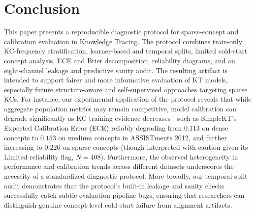 \section{Conclusion}
\label{sec:conclusion}
This paper presents a reproducible diagnostic protocol for sparse-concept and calibration evaluation in Knowledge Tracing. The protocol combines train-only KC-frequency stratification, learner-based and temporal splits, limited cold-start concept analysis, ECE and Brier decomposition, reliability diagrams, and an eight-channel leakage and predictive sanity audit. The resulting artifact is intended to support fairer and more informative evaluation of KT models, especially future structure-aware and self-supervised approaches targeting sparse KCs. For instance, our experimental application of the protocol reveals that while aggregate population metrics may remain competitive, model calibration can degrade significantly as KC training evidence decreases---such as SimpleKT's Expected Calibration Error (ECE) reliably degrading from $0.113$ on dense concepts to $0.153$ on medium concepts in ASSISTments 2012, and further increasing to $0.226$ on sparse concepts (though interpreted with caution given its Limited reliability flag, $N=408$). Furthermore, the observed heterogeneity in performance and calibration trends across different datasets underscores the necessity of a standardized diagnostic protocol. More broadly, our temporal-split audit demonstrates that the protocol's built-in leakage and sanity checks successfully catch subtle evaluation pipeline bugs, ensuring that researchers can distinguish genuine concept-level cold-start failure from alignment artifacts.
